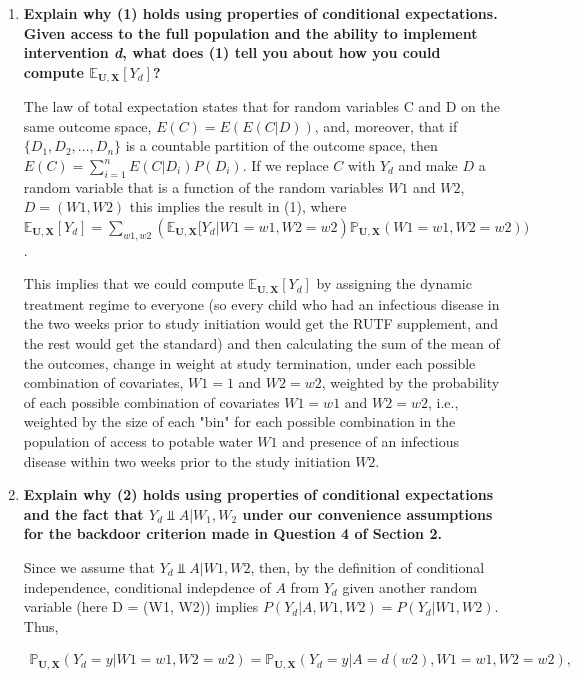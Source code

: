 \documentclass{article}\usepackage[]{graphicx}\usepackage[]{xcolor}
\begin{document}
\begin{enumerate}[label=\textbf{\arabic*.}]
  
  \item \textbf{Explain why (1) holds using properties of conditional expectations. Given access to the full population and the ability to implement intervention \textit{d}, what does (1) tell you about how you could compute $\mathbb{E}_{\bm{U},\bm{X}}[Y_d]$?}
  
  The law of total expectation states that for random variables C and D on the same outcome space, $E(C) = E(E(C|D))$, and, moreover, that if $\{D_1, D_2, \ldots, D_n\}$ is a countable partition of the outcome space, then $E(C) = \sum_{i=1}^{n}E(C|D_i)P(D_i)$. If we replace $C$ with $Y_d$ and make $D$ a random variable that is a function of the random variables $W1$ and $W2$, $D = (W1, W2)$ this implies the result in (1), where $\mathbb{E}_{\bm{U},\bm{X}}[Y_d] = \sum_{w1, w2}(\mathbb{E}_{\bm{U},\bm{X}}[Y_d | W1 = w1, W2 = w2)\mathbb{P}_{\bm{U},\bm{X}}(W1 = w1, W2 = w2))$. 
  
  \vspace{2mm}
  
This implies that we could compute $\mathbb{E}_{\bm{U},\bm{X}}[Y_d]$ by assigning the dynamic treatment regime to everyone (so every child who had an infectious disease in the two weeks prior to study initiation would get the RUTF supplement, and the rest would get the standard) and then calculating the sum of the mean of the outcomes, change in weight at study termination, under each possible combination of covariates, $W1 = 1$ and $W2 = w2$, weighted by the probability of each possible combination of covariates $W1 = w1$ and $W2 = w2$, i.e., weighted by the size of each "bin" for each possible combination in the population of access to potable water $W1$ and presence of an infectious disease within two weeks prior to the study initiation $W2$.
  
  \item \textbf{Explain why (2) holds using properties of conditional expectations and the fact that $Y_d \Perp A|W_1, W_2$ under our convenience assumptions for the backdoor criterion made in Question 4 of Section 2.}
  
  Since we assume that $Y_d \Perp A | W1, W2$, then, by the definition of conditional independence, conditional indepdence of $A$ from $Y_d$ given another random variable (here D = (W1, W2)) implies $P(Y_d|A, W1, W2) = P(Y_d|W1, W2)$. Thus,
  
\begin{align*}
  \mathbb{P}_{\bm{U},\bm{X}}(Y_d = y | W1 = w1, W2 = w2) = 
  \mathbb{P}_{\bm{U},\bm{X}}(Y_d = y | A = d(w2), W1 = w1, W2 = w2),
\end{align*}


\end{enumerate}
\end{document}
